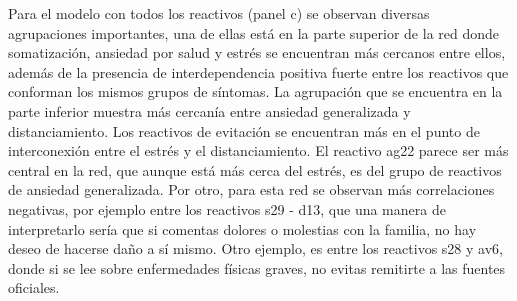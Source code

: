 \documentclass[11pt,spanish]{article}\usepackage[]{graphicx}\usepackage[]{color}
\begin{document}
Para el modelo con todos los reactivos (panel c) se observan diversas agrupaciones importantes, una de ellas está en la parte superior de la red donde somatización, ansiedad por salud y estrés se encuentran más cercanos entre ellos, además de la presencia de interdependencia positiva fuerte entre los reactivos que conforman los mismos grupos de síntomas. La agrupación que se encuentra en la parte inferior muestra más cercanía entre ansiedad generalizada y distanciamiento. Los reactivos de evitación se encuentran más en el punto de interconexión entre el estrés y el distanciamiento. El reactivo ag22 parece ser más central en la red, que aunque está más cerca del estrés, es del grupo de reactivos de ansiedad generalizada. Por otro, para esta red se observan más correlaciones negativas, por ejemplo entre los reactivos s29 - d13, que una manera de interpretarlo sería que si comentas dolores o molestias con la familia, no hay deseo de hacerse daño a sí mismo. Otro ejemplo, es entre los reactivos s28 y av6, donde si se lee sobre enfermedades físicas graves, no evitas remitirte a las fuentes oficiales. 
\end{document}
